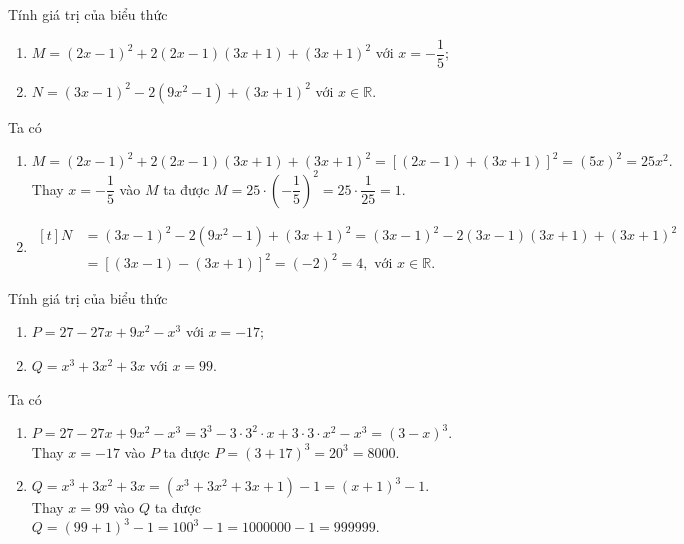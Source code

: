 \begin{vd}
	Tính giá trị của biểu thức
	\begin{enumerate}
		\item $M = (2x-1)^2 + 2(2x-1)(3x+1) + (3x+1)^2$ với $x = - \dfrac{1}{5}$;
		\item $N = (3x-1)^2 - 2\left(9x^2 - 1\right) + (3x+1)^2$ với $x \in \mathbb{R}$.
	\end{enumerate}
	\loigiai 
	{
		Ta có
		\begin{enumerate}
			\item $M = (2x-1)^2 + 2(2x-1)(3x+1) + (3x+1)^2 = [(2x-1) + (3x+1)]^2 = (5x)^2 = 25x^2.$ \\
			Thay $x = -\dfrac{1}{5}$ vào $M$ ta được $M = 25 \cdot \left(-\dfrac{1}{5}\right)^2 = 25 \cdot \dfrac{1}{25} = 1.$
			\item 
				$\begin{aligned}[t]
					N &= (3x-1)^2 - 2\left(9x^2 - 1\right) + (3x+1)^2 = (3x-1)^2 - 2(3x-1)(3x+1) + (3x+1)^2 \\
					&= [(3x-1) - (3x+1)]^2 = (-2)^2 = 4, \text{ với } x \in \mathbb{R}.
				\end{aligned}$
		\end{enumerate}
	}
\end{vd}

\begin{vd}
	Tính giá trị của biểu thức
	\begin{enumerate}
		\item $P = 27 - 27x + 9x^2 - x^3$ với $x = -17;$
		\item $Q = x^3 + 3x^2 + 3x$ với $x = 99.$
	\end{enumerate}
	\loigiai
	{
		Ta có
		\begin{enumerate}
			\item $P = 27 - 27x + 9x^2 - x^3 = 3^3 - 3 \cdot 3^2 \cdot x + 3 \cdot 3 \cdot x^2 - x^3 = (3-x)^3$.\\
			Thay $x = -17$ vào $P$ ta được $P = (3 + 17)^3 = 20^3 = 8000.$
			\item $Q = x^3 + 3x^2 + 3x = \left(x^3 + 3x^2 + 3x + 1\right) - 1 = (x+1)^3 - 1.$ \\
			Thay $x = 99$ vào $Q$ ta được $Q = (99+1)^3 - 1 = 100^3 - 1 = 1000000 - 1 = 999999.$
		\end{enumerate}
	}
\end{vd}


